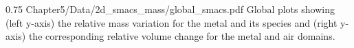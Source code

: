 \begin{figureth}
{0.75}
{Chapter5/Data/2d_smacs_mass/global_smacs.pdf}
{Global plots showing (left y-axis) the relative mass variation for the metal and its species and (right y-axis) the corresponding relative volume change for the metal and air domains.}
\label{fig:smacs_mass_volume}
\end{figureth}




  
  

\newpage
\newpage


